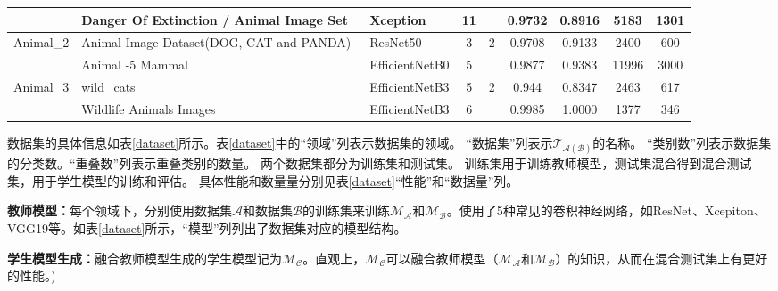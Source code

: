 \documentclass[fontset=macnew,UTF8]{article} %
\begin{document}
\begin{table}[t]
{\begin{tabular}{|l|l|l|c|c|cc|cc|}
				& Danger Of Extinction / Animal   Image Set~\cite{DangerOfExtinction}  & Xception               & 11                          &                                         & \multicolumn{1}{c|}{0.9732}    & 0.8916   & \multicolumn{1}{c|}{5183}       & 1301                           \\ \hline
				\multirow{2}{*}{Animal\_2} & Animal Image Dataset(DOG, CAT and PANDA)~\cite{AnimalImageDataset}   & ResNet50               & 3                           & \multirow{2}{*}{2}                      & \multicolumn{1}{c|}{0.9708}    & 0.9133   & \multicolumn{1}{c|}{2400}       & 600                            \\ \cline{2-4} \cline{6-9} 
				& Animal -5 Mammal~\cite{Animal5Mammal}                           & EfficientNetB0         & 5                           &                                         & \multicolumn{1}{c|}{0.9877}    & 0.9383   & \multicolumn{1}{c|}{11996}      & 3000                           \\ \hline
				\multirow{2}{*}{Animal\_3} & wild\_cats~\cite{wildCats}                                 & EfficientNetB3         & 5                           & \multirow{2}{*}{2}                      & \multicolumn{1}{c|}{0.944}     & 0.8347   & \multicolumn{1}{c|}{2463}       & 617                            \\ \cline{2-4} \cline{6-9} 
				& Wildlife Animals Images~\cite{WildlifeAnimalsImages}                    & EfficientNetB3         & 6                           &                                         & \multicolumn{1}{c|}{0.9985}    & 1.0000   & \multicolumn{1}{c|}{1377}       & 346                            \\ \hline
			\end{tabular}
		}
	\end{table}


数据集的具体信息如表\ref{dataset}所示。表\ref{dataset}中的“领域”列表示数据集的领域。 “数据集”列表示$\mathcal{T_{A(B)}}$的名称。 “类别数”列表示数据集的分类数。“重叠数”列表示重叠类别的数量。 两个数据集都分为训练集和测试集。 训练集用于训练教师模型，测试集混合得到混合测试集，用于学生模型的训练和评估。 具体性能和数量量分别见表\ref{dataset}“性能”和“数据量”列。

\textbf{教师模型：}每个领域下，分别使用数据集$\mathcal{A}$和数据集$\mathcal{B}$的训练集来训练$\mathcal{M_A}$和$\mathcal{M_B}$。使用了5种常见的卷积神经网络，如ResNet、Xcepiton、VGG19等。如表\ref{dataset}所示，“模型”列列出了数据集对应的模型结构。

\textbf{学生模型生成：}融合教师模型生成的学生模型记为$\mathcal{M_C}$。直观上，$\mathcal{M_C}$可以融合教师模型（$\mathcal{M_A}$和$\mathcal{M_B}$）的知识，从而在混合测试集上有更好的性能。)
\end{document}
